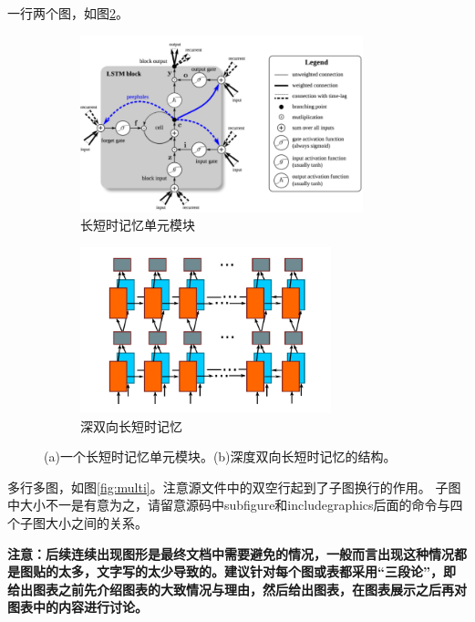 一行两个图，如图\ref{fig:lstm}。
\begin{figure}[ht!]
	\centering
	\begin{subfigure}{.5\textwidth}
		\centering
		\includegraphics[width=0.9\textwidth]{figure/chapter4/lstm1.png}
		\caption{长短时记忆单元模块}
	\end{subfigure}
	\begin{subfigure}{.4\textwidth}
		\centering
		\includegraphics[width=0.8\textwidth]{figure/chapter4/lstm2.png}
		\caption{深双向长短时记忆}
		\label{fig:lstm2}
	\end{subfigure}
	\caption{(a)一个长短时记忆单元模块。(b)深度双向长短时记忆的结构。}
	\label{fig:lstm}
\end{figure}

多行多图，如图\ref{fig:multi}。注意源文件中的双空行起到了子图换行的作用。
子图中大小不一是有意为之，请留意源码中subfigure和includegraphics后面的命令与四个子图大小之间的关系。

\textbf{注意：后续连续出现图形是最终文档中需要避免的情况，一般而言出现这种情况都是图贴的太多，文字写的太少导致的。建议针对每个图或表都采用“三段论”，即给出图表之前先介绍图表的大致情况与理由，然后给出图表，在图表展示之后再对图表中的内容进行讨论。}

